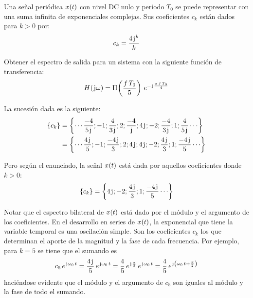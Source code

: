 \begin{mdframed}[style=ExampleFrame]
    \begin{example}
        \label{ej:hermitiana}
    \end{example}
    Una señal periódica $\fx[x]{t}$ con nivel DC nulo y período $T_0$ se puede representar con una suma infinita de exponenciales complejas.
    Sus coeficientes $c_k$ están dados para $k>0$ por:
    \[
        c_k = \frac{4 \iu^k}{k}
    \]

    Obtener el espectro de salida para un sistema con la siguiente función de transferencia:
    \[
        \fx[H]{\iu \omega} =
        \pulse{f \, T_0}{5}
        \, e^{- \iu \frac{\pi \, f \, T_0}{4}}
    \]
    
    
    La sucesión dada es la siguiente:
    \begin{align*}
        \inBraces{c_k}
        & = \inBraces{\cdots \frac{-4}{5 \iu} ; -1 ; \frac{4}{3 \iu} ; 2 ; \frac{-4}{\iu} ; 4 \iu ; -2 ; \frac{-4}{3 \iu} ; 1 ; \frac{4}{5 \iu} \cdots}
        \\
        & = \inBraces{\cdots \frac{4 \iu}{5} ; -1 ; \frac{-4 \iu}{3} ; 2 ; 4 \iu ; 4 \iu ; -2 ; \frac{4 \iu}{3} ; 1 ; \frac{-4 \iu}{5} \cdots}
    \end{align*}

    Pero según el enunciado, la señal $\fx[x]{t}$ está dada por aquellos coeficientes donde $k>0$:
    \[
        \inBraces{c_k} = \inBraces{4 \iu ; -2 ; \frac{4 \iu}{3} ; 1 ; \frac{-4 \iu}{5} \cdots}
    \]

    Notar que el espectro bilateral de $\fx[x]{t}$ está dado por el módulo y el argumento de los coeficientes.
    En el desarrollo en series de $\fx[x]{t}$, la exponencial que tiene la variable temporal es una oscilación simple.
    Son los coeficientes $c_k$ los que determinan el aporte de la magnitud y la fase de cada frecuencia.
    Por ejemplo, para $k=5$ se tiene que el sumando es
    \[
        c_5 \, e^{\iu \omega_0 \, t}
        = \frac{4 \iu}{5} \, e^{\iu \omega_0 \, t}
        = \frac{4}{5} \, e^{\iu \frac{\pi}{2}} \, e^{\iu \omega_0 \, t}
        = \frac{4}{5} \, e^{\iu \inParentheses{\omega_0 \, t + \frac{\pi}{2}}}
    \]
    haciéndose evidente que el módulo y el argumento de $c_5$ son iguales al módulo y la fase de todo el sumando.


\end{mdframed}
